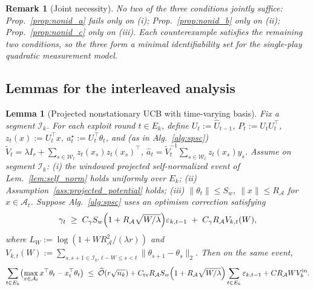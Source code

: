 \documentclass{article}
\newcommand{\cA}{\mathcal{A}}
\newcommand{\cI}{\mathcal{I}}
\newcommand{\cW}{\mathcal{W}}
\newcommand{\tilO}{\widetilde{\mathcal{O}}}
\newtheorem{lemma}[theorem]{Lemma}
\newtheorem{remark}[theorem]{Remark}
\begin{document}
\begin{remark}[Joint necessity]
\label{rem:joint_necessity_conf}
No two of the three conditions jointly suffice:
Prop.~\ref{prop:nonid_a} fails only on (i);
Prop.~\ref{prop:nonid_b} only on (ii);
Prop.~\ref{prop:nonid_c} only on (iii). Each counterexample
satisfies the remaining two conditions, so the three form a minimal
identifiability set for the single-play quadratic measurement model.
\end{remark}

\subsection{Lemmas for the interleaved analysis}
\label{app:proof_main_lemmas}

\begin{lemma}[Projected nonstationary UCB with time-varying basis]
\label{lem:F2pp}
Fix a segment $\cI_k$. For each exploit round $t\in E_k$, define
$U_t:=\widehat U_{t-1}$, $P_t:=U_t U_t^\top$, $z_t(x):=U_t^\top x$,
$a_t^\star:=U_t^\top\theta_t$, and (as in Alg.~\ref{alg:spsc})
$\widetilde V_t = \lambda I_r+\sum_{s\in\cW_t}z_t(x_s)z_t(x_s)^\top$,
$\widehat a_t = \widetilde V_t^{-1}\sum_{s\in\cW_t}z_t(x_s)y_s$.
Assume on segment $\cI_k$: (i) the windowed projected self-normalized
event of Lem.~\ref{lem:self_norm} holds uniformly over $E_k$;
(ii) Assumption~\ref{ass:projected_potential} holds;
(iii) $\|\theta_t\|\le S_w$, $\|x\|\le R_\cA$ for $x\in\cA_t$.
Suppose Alg.~\ref{alg:spsc} uses an optimism correction satisfying
\begin{equation}
\gamma_t \;\ge\; C_\gamma S_w\Bigl(1+R_\cA\sqrt{W/\lambda}\Bigr)\varepsilon_{k,t-1}
\;+\; C_\gamma R_\cA V_{k,t}(W),
\label{eq:gamma_choice}
\end{equation}
where $L_W:=\log(1+WR_\cA^2/(\lambda r))$ and
$V_{k,t}(W):=\sum_{s,s+1\in\cI_k,\,t-W\le s<t}\|\theta_{s+1}-\theta_s\|_2$.
Then on the same event,
\begin{equation}
\sum_{t\in E_k}\bigl(\max_{x\in\cA_t}x^\top\theta_t-x_t^\top\theta_t\bigr)
\;\le\; \tilO(r\sqrt{n_k})
+ C_{\rm tv}R_\cA S_w\Bigl(1+R_\cA\sqrt{W/\lambda}\Bigr)\sum_{t\in E_k}\varepsilon_{k,t-1}
+ C R_\cA W V_k^{\rm in}.
\label{eq:F2pp}
\end{equation}
\end{lemma}
\end{document}
